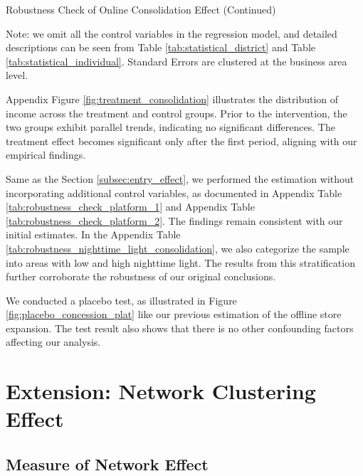 \documentclass[11pt]{article}
\begin{document}
\begin{table}
  \begin{center}
    \begin{scriptsize}
      \caption{Robustness Check of Online Consolidation Effect (Continued)}
      \label{tab:heter_platform_did_2}
      
    
    Note: we omit all the control variables in the regression model, and detailed descriptions can be seen from Table \ref{tab:statistical_district} and Table \ref{tab:statistical_individual}. Standard Errors are clustered at the business area level.
    \end{scriptsize}
  \end{center}
\end{table}

Appendix Figure \ref{fig:treatment_consolidation} illustrates the distribution of income across the treatment and control groups. Prior to the intervention, the two groups exhibit parallel trends, indicating no significant differences. The treatment effect becomes significant only after the first period, aligning with our empirical findings. 

Same as the Section \ref{subsec:entry_effect}, we performed the estimation without incorporating additional control variables, as documented in Appendix Table \ref{tab:robustness_check_platform_1} and Appendix Table \ref{tab:robustness_check_platform_2}. The findings remain consistent with our initial estimates. In the Appendix Table \ref{tab:robustness_nighttime_light_consolidation}, we also categorize the sample into areas with low and high nighttime light. The results from this stratification further corroborate the robustness of our original conclusions.

We conducted a placebo test, as illustrated in Figure \ref{fig:placebo_concession_plat} like our previous estimation of the offline store expansion. The test result also shows that there is no other confounding factors affecting our analysis. 

\section{Extension: Network Clustering Effect} \label{sec:network_effect}

\subsection{Measure of Network Effect} \label{subsec:measure_network_effect}
\end{document}
